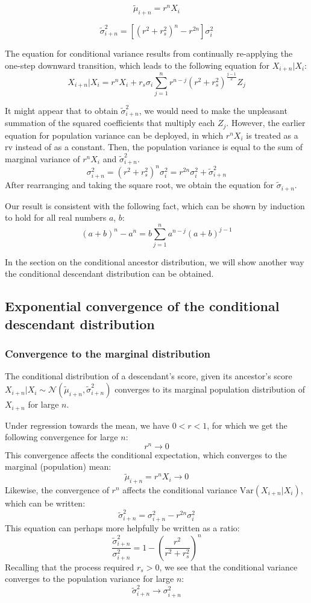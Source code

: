 \documentclass[a4paper,11pt]{article} %
\begin{document}
$$\tilde{\mu}_{i+n} = r^nX_i$$

$$\tilde{\sigma}_{i+n}^2 = [(r^2+r_s^2)^n-r^{2n}] \sigma_i^2$$

The equation for conditional variance results from continually re-applying the one-step downward transition, which leads to the following equation for $X_{i+n}|X_i$:
$$X_{i+n}|X_i = r^nX_i + r_s\sigma_i \sum_{j=1}^{n}r^{n-j}(r^2+r_s^2)^{\frac{j-1}{2}}Z_j$$

It might appear that to obtain $\tilde{\sigma}_{i+n}^2$, we would need to make the unpleasant summation of the squared coefficients that multiply each $Z_j$. However, the earlier equation for population variance can be deployed, in which $r^nX_i$ is treated as a rv instead of as a constant. Then, the population variance is equal to the sum of marginal variance of $r^nX_i$ and $\tilde{\sigma}_{i+n}^2$.
%
$$\sigma_{i+n}^2 =  (r^2+r_s^2)^n  \sigma_{i}^2 =  r^{2n}\sigma_i^2 + \tilde{\sigma}_{i+n}^2$$
%
After rearranging and taking the square root, we obtain the equation for $\tilde{\sigma}_{i+n}$.

Our result is consistent with the following fact, which can be shown by induction to hold for all real numbers $a$,  $b$:
$$(a+b)^n - a^n = b \sum_{j=1}^{n}a^{n-j}(a+b)^{j-1}$$

In the section on the conditional ancestor distribution, we will show another way the conditional descendant distribution can be obtained.




\subsection{Exponential convergence of the conditional descendant distribution}

\subsubsection*{Convergence to the marginal distribution}
The conditional distribution of a descendant's score, given its ancestor's score $X_{i+n}|X_i \sim \mathcal{N}( \tilde{\mu}_{i+n}, \tilde{\sigma}_{i+n}^2)$ converges to its marginal population distribution of $X_{i+n}$ for large $n$.

Under regression towards the mean, we have $0 < r < 1$, for which we get the following convergence for large $n$:
$$r^n \rightarrow 0$$
This convergence affects the conditional expectation, which converges to the marginal (population) mean:
$$\tilde{\mu}_{i+n} = r^nX_i \rightarrow 0$$
Likewise, the convergence of $r^n$ affects the conditional variance $\mathrm{Var}(X_{i+n}|X_i)$, which can be written:
$$\tilde{\sigma}_{i+n}^2 = \sigma_{i+n}^2 - r^{2n} \sigma_i^2$$
This equation can perhaps more helpfully be written as a ratio:
$$\frac{\tilde{\sigma}_{i+n}^2}{\sigma_{i+n}^2} = 1 - (\frac{r^2}{r^2+r_s^2})^n$$
Recalling that the process required $r_s > 0$, we see that the conditional variance converges to the population variance for large $n$:
$$\tilde{\sigma}_{i+n}^2 \rightarrow \sigma_{i+n}^2$$
\end{document}

